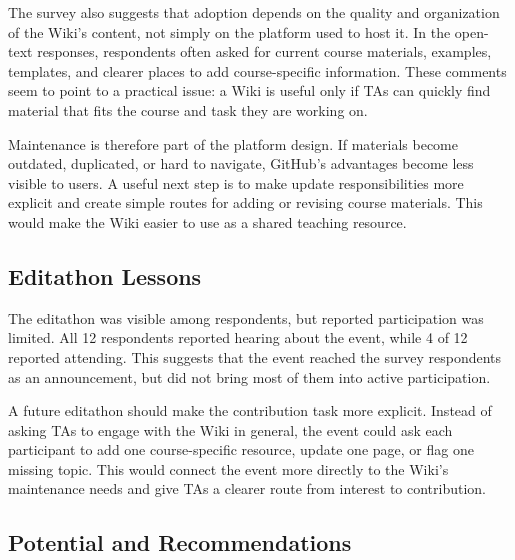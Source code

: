 \documentclass[11pt]{article}
\newcommand{\td}[1]{\item \textcolor{red!70!black}{TODO: #1}}
\begin{document}
The survey also suggests that adoption depends on the quality and organization of the Wiki's content, not simply on the platform used to host it. In the open-text responses, respondents often asked for current course materials, examples, templates, and clearer places to add course-specific information. These comments seem to point to a practical issue: a Wiki is useful only if TAs can quickly find material that fits the course and task they are working on.

Maintenance is therefore part of the platform design. If materials become outdated, duplicated, or hard to navigate, GitHub's advantages become less visible to users. A useful next step is to make update responsibilities more explicit and create simple routes for adding or revising course materials. This would make the Wiki easier to use as a shared teaching resource.

\subsection{Editathon Lessons}

The editathon was visible among respondents, but reported participation was limited. All 12 respondents reported hearing about the event, while 4 of 12 reported attending. This suggests that the event reached the survey respondents as an announcement, but did not bring most of them into active participation.

A future editathon should make the contribution task more explicit. Instead of asking TAs to engage with the Wiki in general, the event could ask each participant to add one course-specific resource, update one page, or flag one missing topic. This would connect the event more directly to the Wiki's maintenance needs and give TAs a clearer route from interest to contribution.

\subsection{Potential and Recommendations}
\end{document}
